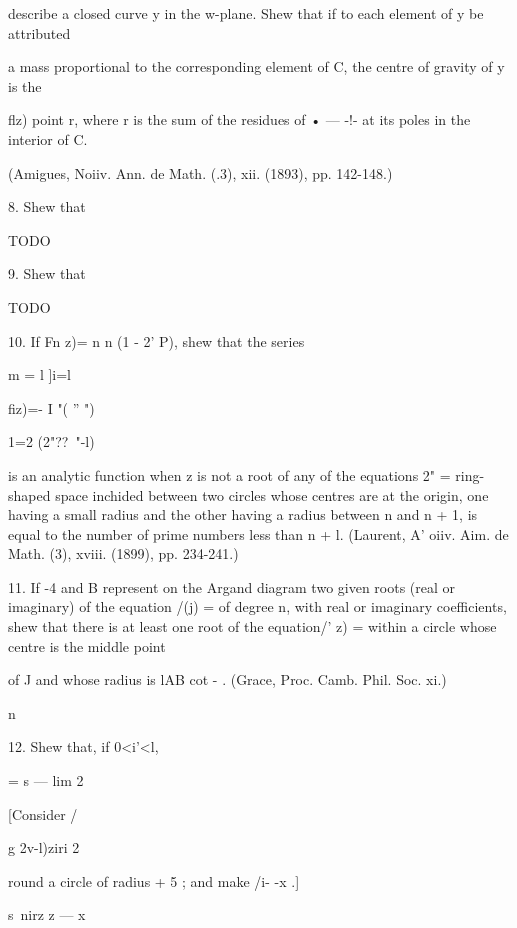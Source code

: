 describe a closed curve y in the w-plane. Shew that if to each element
of y be attributed

a mass proportional to the corresponding element of C, the centre of
gravity of y is the

flz) point r, where r is the sum of the residues of • — -!- at its
poles in the interior of C.

(Amigues, Noiiv. Ann. de Math. (.3), xii. (1893), pp. 142-148.)

8. Shew that

TODO

9. Shew that



TODO

%
%

10. If Fn z)= n n (1 - 2' P), shew that the series

m = l ]i=l

fiz)=- I "( '' ")



1=2 (2"??~"-l)%

is an analytic function when z is not a root of any of the equations
2" = %
ring-shaped space inchided between two circles whose centres are at
the origin, one having a small radius and the other having a radius
between n and n + 1, is equal to the number of prime numbers less than
n + l. (Laurent, A' oiiv. Aim. de Math. (3), xviii. (1899), pp.
234-241.)

11. If -4 and B represent on the Argand diagram two given roots (real
or imaginary) of the equation /(j) = of degree n, with real or
imaginary coefficients, shew that there is at least one root of the
equation/' z) = within a circle whose centre is the middle point

of J and whose radius is lAB cot - . (Grace, Proc. Camb. Phil. Soc.
xi.)

n



12. Shew that, if 0<i'<l,



= s — lim 2



[Consider /



g 2v-l)ziri 2

round a circle of radius + 5 ; and make /i- -x .]



s\ nirz z — x

